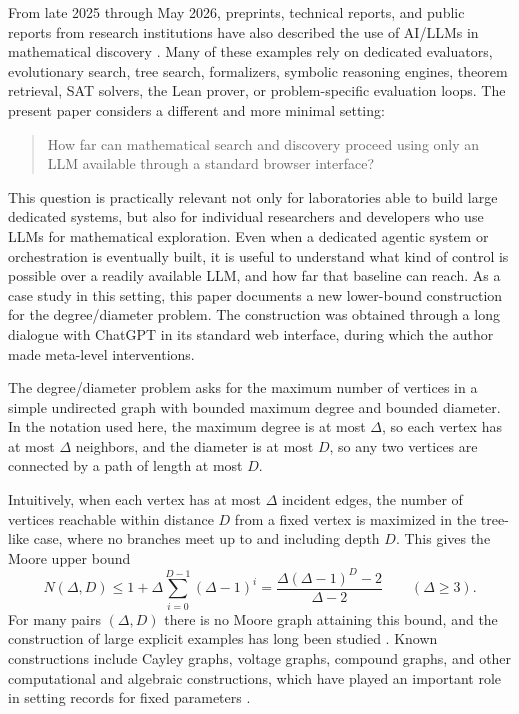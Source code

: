 \documentclass[11pt]{article}
\theoremstyle{definition}
\theoremstyle{remark}
\renewcommand{\_}{\textunderscore\allowbreak}
\begin{document}
From late 2025 through May 2026, preprints, technical reports, and
public reports from research institutions have also described the use of
AI/LLMs in mathematical discovery \cite{Bubeck2025, Woodruff2026,
NagdaRaghavanThakurta2026, BhanNobiliLanger2026, JuEtAl2026,
PrzybockiMackeyHeuleSubercaseaux2026, TsoukalasEtAl2026, OpenAI2026,
AlonEtAl2026}. Many of these examples rely on dedicated evaluators,
evolutionary search, tree search, formalizers, symbolic reasoning
engines, theorem retrieval, SAT solvers, the Lean prover, or
problem-specific evaluation loops. The present paper considers a
different and more minimal setting:

\begin{quote}
How far can mathematical search and discovery proceed using only an LLM
available through a standard browser interface?
\end{quote}

This question is practically relevant not only for laboratories able to
build large dedicated systems, but also for individual researchers and
developers who use LLMs for mathematical exploration. Even when a
dedicated agentic system or orchestration is eventually built, it is
useful to understand what kind of control is possible over a readily
available LLM, and how far that baseline can reach. As a case study in
this setting, this paper documents a new lower-bound construction for
the degree/diameter problem. The construction was obtained through a
long dialogue with ChatGPT in its standard web interface, during which
the author made meta-level interventions.

The degree/diameter problem asks for the maximum number of vertices in a
simple undirected graph with bounded maximum degree and bounded
diameter. In the notation used here, the maximum degree is at most
\(\Delta\), so each vertex has at most \(\Delta\) neighbors, and the
diameter is at most \(D\), so any two vertices are connected by a path
of length at most \(D\).

Intuitively, when each vertex has at most \(\Delta\) incident edges, the
number of vertices reachable within distance \(D\) from a fixed vertex
is maximized in the tree-like case, where no branches meet up to and
including depth \(D\). This gives the Moore upper bound \[
  N(\Delta,D)
  \le
  1+\Delta\sum_{i=0}^{D-1}(\Delta-1)^i
  =\frac{\Delta(\Delta-1)^D-2}{\Delta-2}
  \qquad(\Delta\ge3).
\] For many pairs \((\Delta,D)\) there is no Moore graph attaining this
bound, and the construction of large explicit examples has long been
studied \cite{HoffmanSingleton1960, Damerell1973, Bannai1973,
MillerSiran2013}. Known constructions include Cayley graphs, voltage
graphs, compound graphs, and other computational and algebraic
constructions, which have played an important role in setting records
for fixed parameters \cite{BermondDelormeFarhi1984,
BermondDelormeQuisquater1986, LozSiran2008, Comellas2026}.
\end{document}
